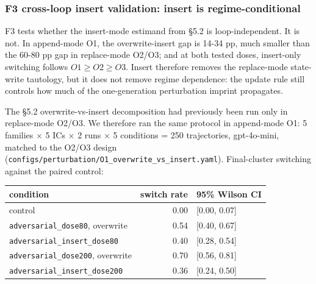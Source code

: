 \documentclass{article}
\theoremstyle{plain}
\theoremstyle{definition}
\begin{document}
\subsubsection{F3 cross-loop insert validation: insert is regime-conditional}

F3 tests whether the insert-mode estimand from §5.2 is loop-independent. It is not. In append-mode O1, the overwrite-insert gap is 14-34 pp, much smaller than the 60-80 pp gap in replace-mode O2/O3; and at both tested doses, insert-only switching follows \(O1 \ge O2 \ge O3\). Insert therefore removes the replace-mode state-write tautology, but it does not remove regime dependence: the update rule still controls how much of the one-generation perturbation imprint propagates.

The §5.2 overwrite-vs-insert decomposition had previously been run only in replace-mode O2/O3. We therefore ran the same protocol in append-mode O1: 5 families × 5 ICs × 2 runs × 5 conditions = 250 trajectories, gpt-4o-mini, matched to the O2/O3 design (\texttt{configs/perturbation/O1\_overwrite\_vs\_insert.yaml}). Final-cluster switching against the paired control:

\begin{table}[h!]
\centering
\small
\begin{tabular}{lrl}
\toprule
condition & switch rate & 95\% Wilson CI \\
\midrule
control & 0.00 & [0.00, 0.07] \\
\texttt{adversarial\_dose80}, overwrite & 0.54 & [0.40, 0.67] \\
\texttt{adversarial\_insert\_dose80} & 0.40 & [0.28, 0.54] \\
\texttt{adversarial\_dose200}, overwrite & 0.70 & [0.56, 0.81] \\
\texttt{adversarial\_insert\_dose200} & 0.36 & [0.24, 0.50] \\
\bottomrule
\end{tabular}
\end{table}
\end{document}
